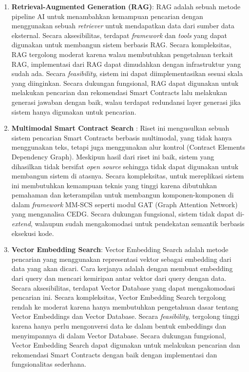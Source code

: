 \begin{enumerate}
	\item \textbf{Retrieval-Augmented Generation (RAG)}: RAG adalah sebuah metode pipeline AI untuk menambahkan kemampuan pencarian dengan menggunakan sebuah \textit{retriever} untuk mendapatkan data dari sumber data eksternal. Secara aksesibilitas, terdapat \textit{framework} dan \textit{tools} yang dapat digunakan untuk membangun sistem berbasis RAG. Secara kompleksitas, RAG tergolong moderat karena walau membutuhkan pengetahuan terkait RAG, implementasi dari RAG dapat dimudahkan dengan infrastruktur yang sudah ada. Secara \textit{feasibility}, sistem ini dapat diimplementasikan sesuai skala yang diinginkan. Secara dukungan fungsional, RAG dapat digunakan untuk melakukan pencarian dan rekomendasi Smart Contracts lalu melakukan generasi jawaban dengan baik, walau terdapat redundansi layer generasi jika sistem hanya digunakan untuk pencarian.

	\item \textbf{Multimodal Smart Contract Search} \parencite{shi2021semantic}: Riset ini mengusulkan sebuah sistem pencarian Smart Contracts berbasis multimodal, yang tidak hanya menggunakan teks, tetapi juga menggunakan alur kontrol (Contract Elements Dependency Graph). Meskipun hasil dari riset ini baik, sistem yang dihasilkan tidak bersifat \textit{open source} sehingga tidak dapat digunakan untuk membangun sistem di atasnya. Secara kompleksitas, untuk mereplikasi sistem ini membutuhkan kemampuan teknis yang tinggi karena dibutuhkan pemahaman dan keterampilan untuk membangun komponen-komponen di dalam \textit{framework} MM-SCS seperti modul GAT (Graph Attention Network) yang menganalisa CEDG. Secara dukungan fungsional, sistem tidak dapat di-\textit{extend}, walaupun sudah mengakomodasi untuk pendekatan semantik berbasis eksekusi kode.

	\item \textbf{Vector Embedding Search}: Vector Embedding Search adalah metode pencarian yang menggunakan representasi vektor sebagai embedding dari data yang akan dicari. Cara kerjanya adalah dengan membuat embedding dari query dan mencari kemiripan antar vektor dari query dengan data. Secara aksesibilitas, terdapat Vector Database yang dapat mengakomodasi pencarian ini. Secara kompleksitas, Vector Embedding Search tergolong rendah ke moderat karena hanya membutuhkan pengetahuan dasar tentang Vector Embeddings dan Vector Database. Secara \textit{feasibility}, tergolong tinggi karena hanya perlu mengonversi data ke dalam bentuk embeddings dan menyimpannya di dalam Vector Database. Secara dukungan fungsional, Vector Embedding Search dapat digunakan untuk melakukan pencarian dan rekomendasi Smart Contracts dengan baik dengan implementasi dan fungsionalitas sederhana.
\end{enumerate}